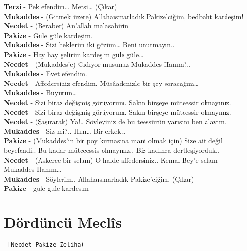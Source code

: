 \documentclass[]{book}
\begin{document}
\textbf{Terzi} - Pek efendim\ldots{} Mersi\ldots{} (Çıkar)\\
\textbf{Mukaddes} - (Gitmek üzere) Allahaısmarladık Pakize'ciğim, bedbaht kardeşim!\\
\textbf{Necdet} - (Beraber) An'allah ma'asabirin\\
\textbf{Pakize} - Güle güle kardeşim.\\
\textbf{Mukaddes} - Sizi beklerim iki gözüm\ldots{} Beni unutmayın..\\
\textbf{Pakize} - Hay hay gelirim kardeşim güle güle\ldots{}\\
\textbf{Necdet} - (Mukaddes'e) Gidiyor musunuz Mukaddes Hanım?..\\
\textbf{Mukaddes} - Evet efendim.\\
\textbf{Necdet} - Affedersiniz efendim. Müsâadenizle bir şey soracağım\ldots{}\\
\textbf{Mukaddes} - Buyurun\ldots{}\\
\textbf{Necdet} - Sizi biraz değişmiş görüyorum. Sakın birşeye müteessir olmayınız.\\
\textbf{Necdet} - Sizi biraz değişmiş görüyorum. Sakın birşeye müteessir olmayınız.\\
\textbf{Necdet} - (Şaşırarak) Ya!.. Söyleyiniz de bu teessürün yarısını ben alayım.\\
\textbf{Mukaddes} - Siz mi?.. Hım\ldots{} Bir erkek\ldots{}\\
\textbf{Pakize} - (Mukaddes'in bir poy kırmasına mani olmak için) Size ait değil beyefendi.. Bu kadar mütecessis olmayınız.. Biz kadınca dertleşiyorduk..\\
\textbf{Necdet} - (Askerce bir selam) O halde affedersiniz.. Kemal Bey'e selam Mukaddes Hanım\ldots{}\\
\textbf{Mukaddes} - Söylerim.. Allahaısmarladık Pakize'ciğim. (Çıkar)\\
\textbf{Pakize} - gule gule kardesim\\

\hypertarget{dorduncu-meclis}{%
\section{Dördüncü Meclîs}\label{dorduncu-meclis}}

\begin{verbatim}
 [Necdet-Pakize-Zeliha)
\end{verbatim}
\end{document}
